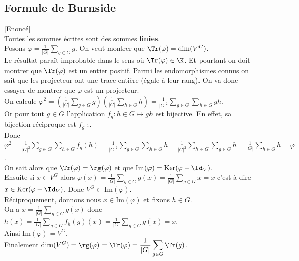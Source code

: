 \documentclass[8pt]{book}
\begin{document}
	
\subsection{Formule de Burnside }
\label{Formule de Burnside corrigé}
	\textcolor{blue}{\hyperref[Formule de Burnside]{[Enoncé]}}\\
	Toutes les sommes écrites sont des sommes \textbf{finies}.\\
	Posons $\varphi=\displaystyle\frac{1}{|G|}\sum\limits_{g\in G}g$. On veut montrer que $\Tr(\varphi)=\dim(V^G)$.\\
	Le résultat paraît improbable dans le sens où $\Tr(\varphi)\in \K$. Et pourtant on doit montrer que $\Tr(\varphi)$ est un entier positif. Parmi les endomorphismes connus on sait que les projecteur ont une trace entière (égale à leur rang). On va donc essayer de montrer que $\varphi$ est un projecteur.\\
	On calcule $\varphi^2=\displaystyle\left(\frac{1}{|G|}\sum\limits_{g\in G}g\right)\left(\frac{1}{|G|}\sum\limits_{h\in G}h\right)=\frac{1}{|G|^2}\sum\limits_{g\in G}\sum\limits_{h\in G}gh$.\\
	Or pour tout $g\in G$ l'application $f_g:h\in G\mapsto gh$ est bijective. En effet, sa bijection réciproque est $f_{g^{-1}}$.\\
	Donc $\varphi^2=\displaystyle\frac{1}{|G|^2}\sum\limits_{g\in G}\sum\limits_{h\in G}f_g(h)=\frac{1}{|G|^2}\sum\limits_{g\in G}\sum\limits_{h\in G}h=\frac{1}{|G|^2}\sum\limits_{h\in G}\sum\limits_{g\in G}h=\frac{1}{|G|}\sum\limits_{h\in G}h=\varphi$.\\
	On sait alors que $\Tr(\varphi)=\rg(\varphi)$ et que Im$(\varphi)=\text{Ker}(\varphi-\Id_V)$.\\
	Ensuite si $x\in V^G$ alors $\varphi(x)=\displaystyle\frac{1}{|G|}\sum\limits_{g\in G}g(x)=\frac{1}{|G|}\sum\limits_{g\in G}x=x$ c'est à dire $x\in \text{Ker}(\varphi-\Id_V)$. Donc $V^G\subset \text{Im}(\varphi)$.\\
	Réciproquement, donnons nous $x\in \text{Im}(\varphi)$ et fixons $h\in G$.\\
	On a $x=\displaystyle\frac{1}{|G|}\sum\limits_{g\in G}g(x)$ donc $h(x)=\displaystyle\frac{1}{|G|}\sum\limits_{g\in G}f_h(g)(x)=\frac{1}{|G|}\sum\limits_{g\in G}g(x)=x$.\\
	Ainsi Im$(\varphi)=V^G$.\\
	Finalement $\dim(V^G)=\rg(\varphi)=\Tr(\varphi)=\displaystyle\frac{1}{|G|}\sum\limits_{g\in G}\Tr(g)$.
\end{document}
